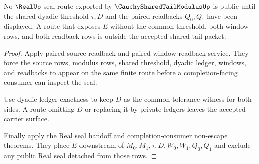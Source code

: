 \begin{theorem}
\label{thm:cauchy-shared-tail-modulus-real-seal-obligation-gate}
No $\RealUp$ seal route exported by $\CauchySharedTailModulusUp$ is public until the shared dyadic threshold $\tau,D$ and the paired readbacks $Q_0,Q_1$ have been displayed. A route that exposes $E$ without the common threshold, both window rows, and both readback rows is outside the accepted shared-tail packet.
\end{theorem}
\begin{proof}
Apply paired-source readback and paired-window readback service. They force the source rows, modulus rows, shared threshold, dyadic ledger, windows, and readbacks to appear on the same finite route before a completion-facing consumer can inspect the seal.

Use dyadic ledger exactness to keep $D$ as the common tolerance witness for both sides. A route omitting $D$ or replacing it by private ledgers leaves the accepted carrier surface.

Finally apply the Real seal handoff and completion-consumer non-escape theorems. They place $E$ downstream of $M_0,M_1,\tau,D,W_0,W_1,Q_0,Q_1$ and exclude any public Real seal detached from those rows.
\end{proof}


